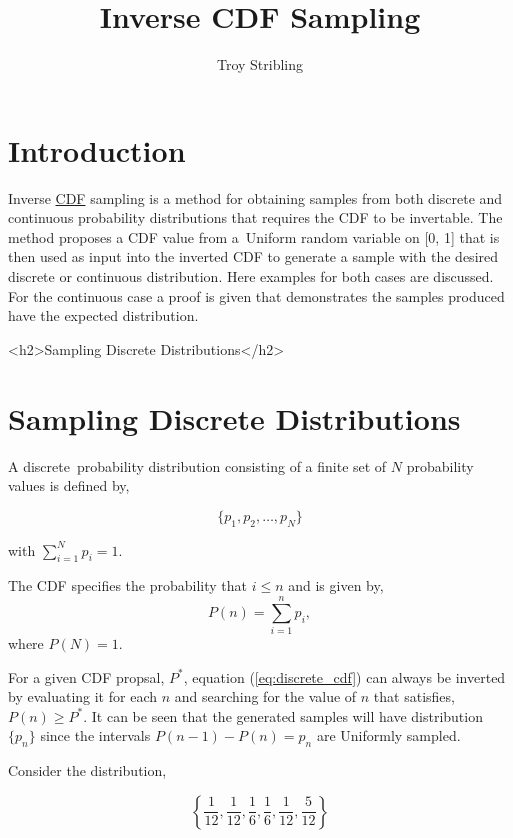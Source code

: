 \documentclass[12pt]{article}
\title{Inverse CDF Sampling}
\author{Troy Stribling}
\begin{document}
\iftex
\maketitle
\section{Introduction}
\fi

Inverse \href{https://en.wikipedia.org/wiki/Cumulative_distribution_function}{CDF} sampling is a method for obtaining samples from both discrete and continuous probability distributions
that requires the CDF to be invertable.
The method proposes a CDF value from a Uniform random variable on [0, 1] that is then used as input
into the inverted CDF to generate a sample
with the desired discrete or continuous distribution. Here examples for both cases are discussed.
For the continuous case a proof is given that demonstrates the samples produced have the expected distribution.


\ifblog
<h2>Sampling Discrete Distributions</h2>
\fi
\iftex
\section{Sampling Discrete Distributions}
\fi

A discrete probability distribution consisting of a finite set of $N$ probability values is defined by,

$$\{p_1, p_2,\ldots,p_N\}$$

with $\sum_{i=1}^N{p_i} = 1.$

The CDF specifies the probability that $i \leq n$ and is given by,
\begin{equation}
\label{eq:discrete_cdf}
P(n)=\sum_{i=1}^n{p_i},
\end{equation}
where $P(N)=1.$

For a given CDF propsal, $P^*$, equation (\ref{eq:discrete_cdf}) can always be inverted by evaluating it for each $n$ and
searching for the value of $n$ that satisfies, $P(n) \geq P^*.$ It can be seen that the generated samples will have
distribution $\{p_n\}$ since the intervals $P(n-1) - P(n) = p_n$ are Uniformly sampled.


Consider the distribution,

\begin{equation} \label{eq:discrete}
\left \{\frac{1}{12}, \frac{1}{12}, \frac{1}{6}, \frac{1}{6}, \frac{1}{12}, \frac{5}{12} \right\}
\end{equation}
\end{document}
